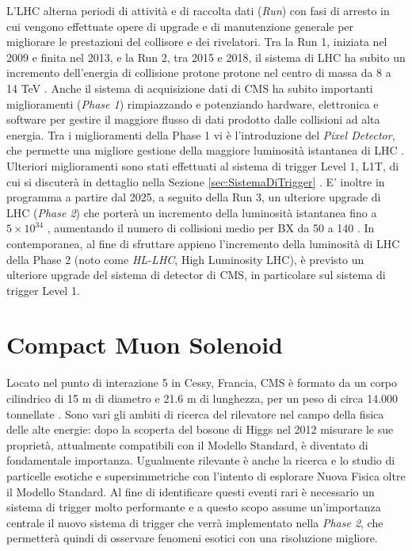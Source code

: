 L'LHC alterna periodi di attività e di raccolta dati (\textit{Run}) con fasi di arresto in cui vengono effettuate opere di upgrade e di manutenzione generale per migliorare le prestazioni del collisore e dei rivelatori. Tra la Run 1, iniziata nel 2009 e finita nel 2013, e la Run 2, tra 2015 e 2018, il sistema di LHC ha subito un incremento dell'energia di collisione protone protone nel centro di massa da 8 a 14 TeV \cite{sirunyan2020performance}. Anche il sistema di acquisizione dati di CMS ha subito importanti miglioramenti (\textit{Phase 1}) rimpiazzando e potenziando hardware, elettronica e software per gestire il maggiore flusso di dati prodotto dalle collisioni ad alta energia. Tra i miglioramenti della Phase 1 vi è l'introduzione del \textit{Pixel Detector}, che permette una migliore gestione della maggiore luminosità istantanea di LHC \cite{Adam:2748381}. Ulteriori miglioramenti sono stati effettuati al sistema di trigger Level 1, L1T, di cui si discuterà in dettaglio nella Sezione \ref{sec:SistemaDiTrigger} \newline.
E' inoltre in programma a partire dal 2025, a seguito della Run 3, un ulteriore upgrade di LHC (\textit{Phase 2}) che porterà un incremento della luminosità istantanea fino a $5\times 10^{34}$ \Lumi, aumentando il numero di collisioni medio per BX da 50 a 140 \cite{collaboration2021phase}. In contemporanea, al fine di sfruttare appieno l'incremento della luminosità di LHC della Phase 2 (noto come \textit{HL-LHC}, High Luminosity LHC), è previsto un ulteriore upgrade del sistema di detector di CMS, in particolare sul sistema di trigger Level 1.


\section{Compact Muon Solenoid}  
\label{sec:CMSDescrizione}

Locato nel punto di interazione 5 in Cessy, Francia, CMS è formato da un corpo cilindrico di 15 m di diametro e 21.6 m di lunghezza, per un peso di circa 14.000 tonnellate \cite{cms2008cms}. Sono vari gli ambiti di ricerca del rilevatore nel campo della fisica delle alte energie: dopo la scoperta del bosone di Higgs nel 2012 misurare le sue proprietà, attualmente compatibili con il Modello Standard, è diventato di fondamentale importanza. Ugualmente rilevante è anche la ricerca e lo studio di particelle esotiche e supersimmetriche con l'intento di esplorare Nuova Fisica oltre il Modello Standard. Al fine di identificare questi eventi rari è necessario un sistema di trigger molto performante \cite{sirunyan2020performance} e a questo scopo assume un'importanza centrale il nuovo sistema di trigger che verrà implementato nella \textit{Phase 2}, che permetterà quindi di osservare fenomeni esotici con una risoluzione migliore.

